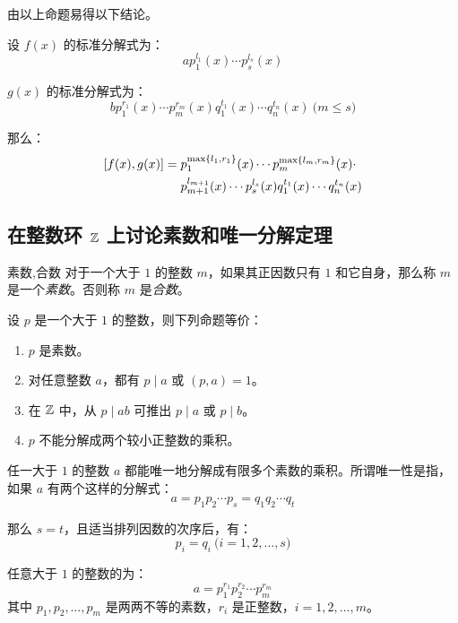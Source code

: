 由以上命题易得以下结论。

\begin{proposition}
	设 $f(x)$ 的标准分解式为：
	$$
	a p_1^{l_1}(x) \cdots p_s^{l_s}(x)
	$$

	$g(x)$ 的标准分解式为：
	$$
	b p_1^{r_1}(x) \cdots p_m^{r_m}(x) q_1^{t_1}(x) \cdots q_n^{t_n}(x) \pod{m \le s}
	$$

	那么：
	$$
	\begin{aligned}\relax
		[f(x), g(x)] &= p_1^{\max\{ l_1, r_1 \}}(x) \cdots p_m^{\max\{ l_m, r_m \}}(x) \cdot
		\\&~~~~
		p_{m + 1}^{l_{m + 1}}(x) \cdots p_s^{l_s}(x) q_1^{t_1}(x) \cdots q_n^{t_n}(x)
	\end{aligned}
	$$
\end{proposition}

\subsection{在整数环 $\mathbb Z$ 上讨论素数和唯一分解定理}

\begin{definition}{素数,合数}
	对于一个大于 $1$ 的整数 $m$，如果其正因数只有 $1$ 和它自身，那么称 $m$ 是一个\emph{素数}。否则称 $m$ 是\emph{合数}。
\end{definition}

\begin{proposition}
	设 $p$ 是一个大于 $1$ 的整数，则下列命题等价：
	\begin{enumerate}
		\item $p$ 是素数。
		\item 对任意整数 $a$，都有 $p \mid a$ 或 $(p, a) = 1$。
		\item 在 $\mathbb Z$ 中，从 $p \mid ab$ 可推出 $p \mid a$ 或 $p \mid b$。
		\item $p$ 不能分解成两个较小正整数的乘积。
	\end{enumerate}
\end{proposition}

\begin{theorem}[算数基本定理]
	任一大于 $1$ 的整数 $a$ 都能唯一地分解成有限多个素数的乘积。所谓唯一性是指，如果 $a$ 有两个这样的分解式：
	$$
	a = p_1 p_2 \cdots p_s  = q_1 q_2 \cdots q_t
	$$

	那么 $s = t$，且适当排列因数的次序后，有：
	$$
	p_i = q_i \pod{i = 1, 2, \ldots, s}
	$$
\end{theorem}

任意大于 $1$ 的整数的\emph{}为：
$$
a = p_1^{r_1} p_2^{r_2} \cdots p_m^{r_m}
$$
其中 $p_1, p_2, \ldots, p_m$ 是两两不等的素数，$r_i$ 是正整数，$i = 1, 2, \ldots, m$。

